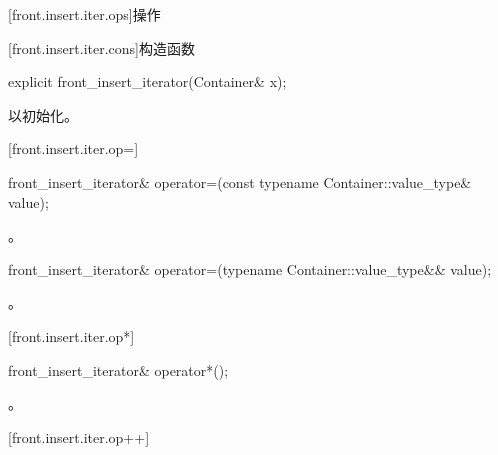 [front.insert.iter.ops]{操作}

[front.insert.iter.cons]{构造函数}

%
\begin{itemdecl}
explicit front_insert_iterator(Container& x);
\end{itemdecl}

\begin{itemdescr}
\pnum
\effects
以初始化。
\end{itemdescr}

[front.insert.iter.op=]{}

%
\begin{itemdecl}
front_insert_iterator& operator=(const typename Container::value_type& value);
\end{itemdecl}

\begin{itemdescr}
\pnum
\effects
{}

\pnum
\returns
{}。
\end{itemdescr}

%
\begin{itemdecl}
front_insert_iterator& operator=(typename Container::value_type&& value);
\end{itemdecl}

\begin{itemdescr}
\pnum
\effects
{}

\pnum
\returns
{}。
\end{itemdescr}

[front.insert.iter.op*]{}

%
\begin{itemdecl}
front_insert_iterator& operator*();
\end{itemdecl}

\begin{itemdescr}
\pnum
\returns
{}。
\end{itemdescr}

[front.insert.iter.op++]{}

